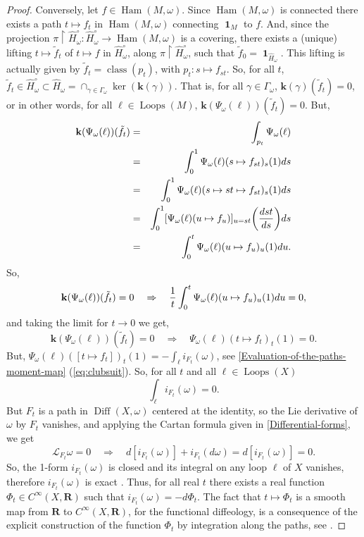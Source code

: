 \documentclass[10pt,reqno,twoside]{amsart}
\newcommand{\RR}{\mathbf{R}}
\DeclareMathOperator{\id}{\mathbf{1}}
\DeclareMathOperator{\Diff}{Diff}
\DeclareMathOperator{\Loops}{Loops}
\DeclareMathOperator{\class}{class}
\DeclareMathOperator{\Ham}{Ham}
\newcommand{\Cinfty}{C^\infty}
\newcommand{\DLie}{\mathcal{L}} %
\newcommand{\ek}{\mathbf{k}}
\theoremstyle{plain}
\theoremstyle{definition}
\begin{document}
\begin{proof}
    Conversely,
    let $f \in \Ham(M, \omega)$.
    Since $\Ham(M,\omega)$ is connected there exists a path $t \mapsto f_t$ in $\Ham(M, \omega)$ connecting $\id_M$ to $f$.
    And,
    since the projection $\pi \restriction \widehat H_\omega^\circ : \widehat H_\omega^\circ \to \Ham(M,\omega)$ is a covering,
    there exists a (unique) lifting $t \mapsto \tilde f_t$ of $t \mapsto f$ in $\widehat H_\omega^\circ$,
    along $\pi \restriction \widehat H_\omega^\circ$,
    such that $\tilde f_0 = \id_{\widehat H_\omega}$.
    This lifting is actually given by $\tilde f_t = \class(p_t)$,
    with $p_t : s \mapsto f_{st}$.
    So,
    for all $t$,
    $\tilde f_t \in \widehat H_\omega^\circ \subset \widehat H_\omega = \cap_{\gamma \in \Gamma_\omega} \ker(\ek(\gamma))$.
    That is,
    for all $\gamma \in \Gamma_\omega$,
    $\ek(\gamma)(\tilde f_t) = 0$,
    or in other words,
    for all $\ell \in \Loops(M)$,
    $\ek(\Psi_\omega(\ell))(\tilde f_t) = 0$.
    But,
    \begin{eqnarray*}
      \ek(\Psi_\omega(\ell))(\tilde f_t) &=& \int_{p_t} \Psi_\omega(\ell) \\
      &=& \int_0^1 \Psi_\omega(\ell)(s \mapsto f_{st})_s(1) ds \\
      &=& \int_0^1 \Psi_\omega(\ell)(s \mapsto st \mapsto f_{st})_s(1) ds \\
      &=& \int_0^1 [\Psi_\omega(\ell)(u \mapsto f_u)]_{u=st} \bigg({d st \over ds}\bigg) ds \\
      &=& \int_0^t \Psi_\omega(\ell)(u \mapsto f_u)_u(1) du.
    \end{eqnarray*}
    So,
    $$
      \ek(\Psi_\omega(\ell))(\tilde f_t) = 0 \quad \Rightarrow \quad {1 \over t} \int_0^t \Psi_\omega(\ell)(u \mapsto f_u)_u(1) du = 0,
      $$
    and taking the limit for $t \to 0$ we get,
    $$
      \ek(\Psi_\omega(\ell))(\tilde f_t) = 0 \quad \Rightarrow \quad \Psi_\omega(\ell)(t \mapsto f_t)_t(1) = 0.
      $$
    But,
    $\Psi_\omega(\ell)([t \mapsto f_t])_t(1) = - \displaystyle\int_\ell i_{F_t}(\omega)$,
    see \ref{Evaluation-of-the-paths-moment-map} (\ref{eq:clubsuit}).
    So,
    for all $t$ and all $\ell \in \Loops(X)$
    $$
      \int_\ell i_{F_t}(\omega) = 0.
      $$
    But $F_t$ is a path in $\Diff(X,\omega)$ centered at the identity,
    so the Lie derivative of $\omega$ by $F_t$ vanishes,
    and applying the Cartan formula given in \ref{Differential-forms},
    we get
    $$
      \DLie_{F_t} \omega = 0 \quad \Rightarrow \quad d[i_{F_t}(\omega)] + i_{F_t}(d\omega) = d[i_{F_t}(\omega)] = 0.
      $$
    So,
    the 1-form $i_{F_t}(\omega)$ is closed and its integral on any loop $\ell$ of $X$ vanishes,
    therefore $i_{F_t}(\omega)$ is exact \cite{Piz05}.
    Thus,
    for all real $t$ there exists a real function $\Phi_t \in \Cinfty(X,\RR)$ such that $i_{F_t}(\omega) = - d\Phi_t$.
    The fact that $t \mapsto \Phi_t$ is a smooth map from $\RR$ to $\Cinfty(X,\RR)$,
    for the functional diffeology,
    is a consequence of the explicit construction of the function $\Phi_t$ by integration along the paths,
    see \cite{Piz05}.
  \end{proof}
  
\end{document}
